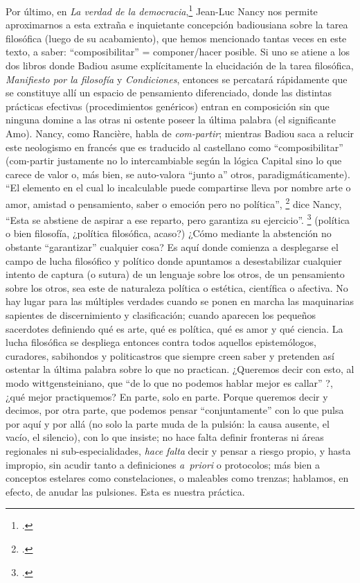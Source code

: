 Por último, en \emph{La verdad de la democracia},\footcite{@7012-NANCY2009} Jean-Luc Nancy nos permite aproximarnos a esta extraña e inquietante concepción badiousiana sobre la tarea filosófica (luego de su acabamiento), que hemos mencionado tantas veces en este texto, a saber: \enquote{composibilitar} = componer/hacer posible. Si uno se atiene a los dos libros donde Badiou asume explícitamente la elucidación de la tarea filosófica, \emph{Manifiesto por la filosofía} y \emph{Condiciones}, entonces se percatará rápidamente que se constituye allí un espacio de pensamiento diferenciado, donde las distintas prácticas efectivas (procedimientos genéricos) entran en composición sin que ninguna domine a las otras ni ostente poseer la última palabra (el significante Amo). Nancy, como Rancière, habla de \emph{com-partir}; mientras Badiou saca a relucir este neologismo en francés que es traducido al castellano como \enquote{composibilitar} (com-partir justamente no lo intercambiable según la lógica Capital sino lo que carece de valor o, más bien, se auto-valora \enquote{junto a} otros, paradigmáticamente). \enquote{El elemento en el cual lo incalculable puede compartirse lleva por nombre arte o amor, amistad o pensamiento, saber o emoción pero no política}, \footcite[34]{@7012-NANCY2009} dice Nancy, \enquote{Esta se abstiene de aspirar a ese reparto, pero garantiza su ejercicio}. \footcite{@7012-NANCY2009} (política o bien filosofía, ¿política filosófica, acaso?) ¿Cómo mediante la abstención no obstante \enquote{garantizar} cualquier cosa? Es aquí donde comienza a desplegarse el campo de lucha filosófico y político donde apuntamos a desestabilizar cualquier intento de captura (o sutura) de un lenguaje sobre los otros, de un pensamiento sobre los otros, sea este de naturaleza política o estética, científica o afectiva. No hay lugar para las múltiples verdades cuando se ponen en marcha las maquinarias sapientes de discernimiento y clasificación; cuando aparecen los pequeños sacerdotes definiendo qué es arte, qué es política, qué es amor y qué ciencia. La lucha filosófica se despliega entonces contra todos aquellos epistemólogos, curadores, sabihondos y politicastros que siempre creen saber y pretenden así ostentar la última palabra sobre lo que no practican. ¿Queremos decir con esto, al modo wittgensteiniano, que \enquote{de lo que no podemos hablar mejor es callar} ?, ¿qué mejor practiquemos? En parte, solo en parte. Porque queremos decir y decimos, por otra parte, que podemos pensar \enquote{conjuntamente} con lo que pulsa por aquí y por allá (no solo la parte muda de la pulsión: la causa ausente, el vacío, el silencio), con lo que insiste; no hace falta definir fronteras ni áreas regionales ni sub-especialidades, \emph{hace falta} decir y pensar a riesgo propio, y hasta impropio, sin acudir tanto a definiciones \emph{a~priori} o protocolos; más bien a conceptos estelares como constelaciones, o maleables como trenzas; hablamos, en efecto, de anudar las pulsiones. Esta es nuestra práctica.

